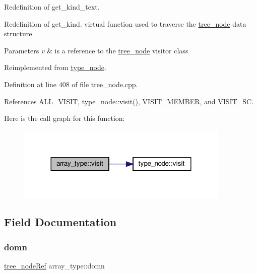Redefinition of get\+\_\+kind\+\_\+text. 

Redefinition of get\+\_\+kind. virtual function used to traverse the \hyperlink{classtree__node}{tree\+\_\+node} data structure. 
\begin{DoxyParams}{Parameters}
{\em v} & is a reference to the \hyperlink{classtree__node}{tree\+\_\+node} visitor class \\
\hline
\end{DoxyParams}


Reimplemented from \hyperlink{structtype__node_adc6e447af5f9505e6305320933c46a96}{type\+\_\+node}.



Definition at line 408 of file tree\+\_\+node.\+cpp.



References A\+L\+L\+\_\+\+V\+I\+S\+IT, type\+\_\+node\+::visit(), V\+I\+S\+I\+T\+\_\+\+M\+E\+M\+B\+ER, and V\+I\+S\+I\+T\+\_\+\+SC.

Here is the call graph for this function\+:
\nopagebreak
\begin{figure}[H]
\begin{center}
\leavevmode
\includegraphics[width=288pt]{d3/d5e/structarray__type_af389e234db3595ab54f93b6656600756_cgraph}
\end{center}
\end{figure}


\subsection{Field Documentation}
\mbox{\label{structarray__type_afda1354e2f6c7eeb435e2c1e12867f71}} 
\subsubsection{\texorpdfstring{domn}{domn}}
{\footnotesize\ttfamily \hyperlink{tree__node_8hpp_a6ee377554d1c4871ad66a337eaa67fd5}{tree\+\_\+node\+Ref} array\+\_\+type\+::domn}



